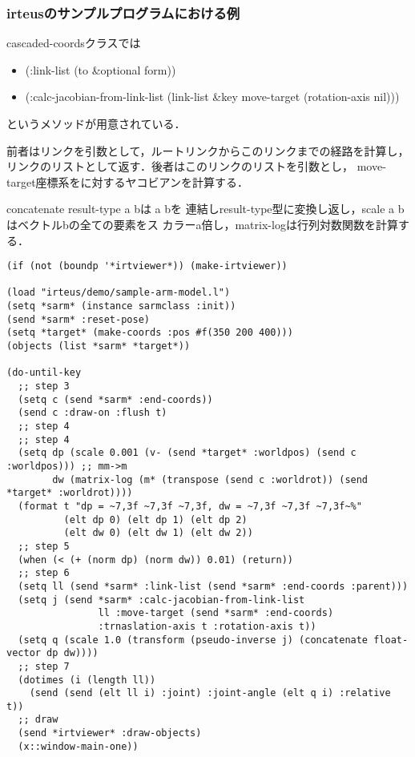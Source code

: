 \subsubsection{irteusのサンプルプログラムにおける例}

cascaded-coordsクラスでは
\begin{itemize}
\item (:link-list (to \&optional form))
\item (:calc-jacobian-from-link-list (link-list \&key move-target
  (rotation-axis nil)))
\end{itemize}
というメソッドが用意されている．

前者はリンクを引数として，ルートリンクからこのリンクまでの経路を計算し，
リンクのリストとして返す．後者はこのリンクのリストを引数とし，
move-target座標系をに対するヤコビアンを計算する．

concatenate result-type a bは a bを
連結しresult-type型に変換し返し，scale a b はベクトルbの全ての要素をス
カラーa倍し，matrix-logは行列対数関数を計算する．

{\baselineskip=10pt
\begin{verbatim}
(if (not (boundp '*irtviewer*)) (make-irtviewer))

(load "irteus/demo/sample-arm-model.l")
(setq *sarm* (instance sarmclass :init))
(send *sarm* :reset-pose)
(setq *target* (make-coords :pos #f(350 200 400)))
(objects (list *sarm* *target*))

(do-until-key
  ;; step 3
  (setq c (send *sarm* :end-coords))
  (send c :draw-on :flush t)
  ;; step 4
  ;; step 4
  (setq dp (scale 0.001 (v- (send *target* :worldpos) (send c :worldpos))) ;; mm->m
        dw (matrix-log (m* (transpose (send c :worldrot)) (send *target* :worldrot))))
  (format t "dp = ~7,3f ~7,3f ~7,3f, dw = ~7,3f ~7,3f ~7,3f~%"
          (elt dp 0) (elt dp 1) (elt dp 2)
          (elt dw 0) (elt dw 1) (elt dw 2))
  ;; step 5
  (when (< (+ (norm dp) (norm dw)) 0.01) (return))
  ;; step 6
  (setq ll (send *sarm* :link-list (send *sarm* :end-coords :parent)))
  (setq j (send *sarm* :calc-jacobian-from-link-list
                ll :move-target (send *sarm* :end-coords)
                :trnaslation-axis t :rotation-axis t))
  (setq q (scale 1.0 (transform (pseudo-inverse j) (concatenate float-vector dp dw))))
  ;; step 7
  (dotimes (i (length ll))
    (send (send (elt ll i) :joint) :joint-angle (elt q i) :relative t))
  ;; draw
  (send *irtviewer* :draw-objects)
  (x::window-main-one))
\end{verbatim}
}

